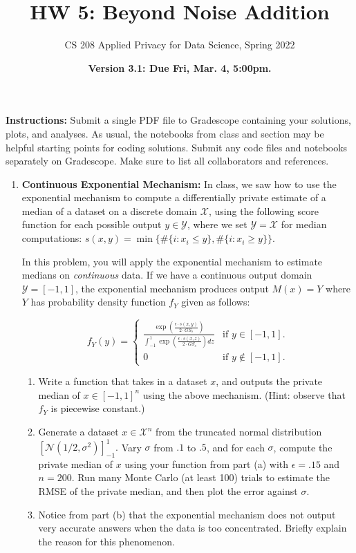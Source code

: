 \documentclass[11pt]{article}
\title{\vspace{-1.5cm} HW 5: Beyond Noise Addition
}
\author{CS 208 Applied Privacy for Data Science, Spring 2022}
\date{\textbf{Version 3.1: Due Fri, Mar. 4, 5:00pm.}}
\newcommand{\instructions}{\noindent \textbf{Instructions:} Submit a single PDF file to Gradescope containing your solutions, plots, and analyses. As usual, the notebooks from class and section may be helpful starting points for coding solutions. Submit any code files and notebooks separately on Gradescope. Make sure to list all collaborators and references.}
\newcommand{\calX}{\mathcal{X}}
\newcommand{\calY}{\mathcal{Y}}
\begin{document}
	\maketitle
	
	\instructions
	
	\begin{enumerate}[leftmargin=*]
		
		\item \textbf{Continuous Exponential Mechanism:}
		In class, we saw how to use the exponential mechanism to compute a differentially private estimate of a median of a dataset on a discrete domain $\calX$, using the following score function for each possible output $y\in \calY$, where we set $\calY=\calX$ for median computations:
		$s(x,y)=\min\{\#\{i: x_i\le y\},\#\{i: x_i\ge y\}\}.$

		
		In this problem, you will apply the exponential mechanism
		to estimate medians on {\em continuous} data.		
		If we have a continuous output domain $\calY=[-1,1]$, the exponential mechanism produces output
		$M(x) = Y$ where $Y$ has probability density function $f_Y$ given as follows:
		
		$$f_Y(y) = \begin{cases}
		\frac{\exp\left(\frac{\epsilon\cdot s(x,y)}{2\cdot GS_s}\right)}{\int_{-1}^1 \exp\left(\frac{\epsilon\cdot s(x,z)}{2\cdot GS_s}\right) dz} & \text{if } y\in [-1,1].\\
		0 & \text{if } y\notin [-1,1].
		\end{cases}$$
		
		\begin{enumerate}
			\item Write a function that takes in a dataset $x$, and outputs the private median of $x\in [-1,1]^n$ using the above mechanism.
			(Hint: observe that $f_Y$ is
			piecewise constant.)
			
			\item Generate a dataset $x\in\calX^n$ from the truncated normal distribution $\left[\mathcal{N}(1/2,\sigma^2)\right]_{-1}^1.$ 
            Vary $\sigma$ from $.1$ to $.5$, and for each $\sigma$, compute the private median of $x$ using your function from part (a) with $\epsilon=.15$ and $n=200$. 
            Run many Monte Carlo (at least 100) trials to estimate the RMSE of the private median, and then plot the error against $\sigma$.
			
			\item Notice from part (b) that the exponential mechanism does
			not output very accurate answers when the data is too concentrated. Briefly explain the reason for this phenomenon.
		\end{enumerate}
		

\end{enumerate}
\end{document}
